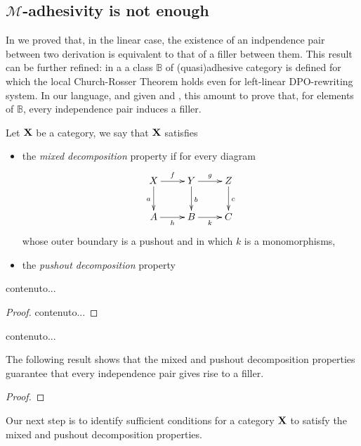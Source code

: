 \subsection{$\mathcal{M}$-adhesivity is not enough}\label{app:fill}
In  we proved that, in the linear case, the existence of an indpendence pair between two derivation is equivalent to that of a filler between them. This result can be further refined: in a\cite{baldan2011adhesivity} a class  $\mathbb{B}$ of (quasi)adhesive category is defined for which the local Church-Rosser Theorem holds even for left-linear DPO-rewriting system. In our language, and given  and , this amount to prove that, for elements of $\mathbb{B}$, every independence pair induces a filler. 

\begin{definition}Let $\textbf {\textup{X}}$ be a category, we say that $\textbf {\textup{X}}$ satisfies
	\begin{itemize}
		\item the \emph{mixed decomposition} property if for every diagram
		\[\xymatrix{X \ar[d]_{a} \ar[r]^{f}& \ar[r]^{g} Y \ar[d]^{b}& Z \ar[d]^{c}\\ A \ar[r]_{h}& B \ar[r]_{k}& C}\]
		whose outer boundary is a pushout and in which $k$ is a monomorphisms, 
		\item the \emph{pushout decomposition} property
	\end{itemize}
\end{definition}

\begin{lemma}
	contenuto...
\end{lemma}
\begin{proof}
	contenuto...\qedhere 
\end{proof}

\begin{corollary}
	contenuto...
\end{corollary}

The following result shows that the mixed and pushout decomposition properties guarantee that every independence pair gives rise to a filler.

\begin{theorem}
\end{theorem}
\begin{proof}\qedhere 
\end{proof}

Our next step is to identify sufficient conditions for a category $\textbf {\textup{X}}$ to satisfy the mixed and pushout decomposition properties.

